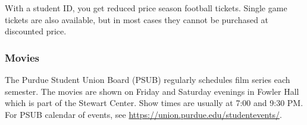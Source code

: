With a student ID, you get reduced price season football tickets. Single game tickets are also available, but in most cases they cannot be purchased at discounted price.



\subsubsection{Movies}
The Purdue Student Union Board (PSUB) regularly schedules film series each semester. The movies are shown on Friday and Saturday evenings in Fowler Hall which is part of the Stewart Center. Show times are usually at 7:00 and 9:30 PM. For PSUB calendar of events, see \url{https://union.purdue.edu/studentevents/}.


